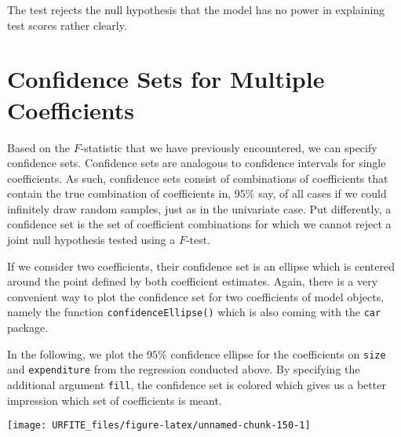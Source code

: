 \documentclass[]{book}
\newenvironment{Shaded}{\begin{snugshade}}{\end{snugshade}}
\newcommand{\KeywordTok}[1]{\textcolor[rgb]{0.13,0.29,0.53}{\textbf{#1}}}
\newcommand{\DataTypeTok}[1]{\textcolor[rgb]{0.13,0.29,0.53}{#1}}
\newcommand{\StringTok}[1]{\textcolor[rgb]{0.31,0.60,0.02}{#1}}
\newcommand{\CommentTok}[1]{\textcolor[rgb]{0.56,0.35,0.01}{\textit{#1}}}
\newcommand{\NormalTok}[1]{#1}
\theoremstyle{definition}
\theoremstyle{definition}
\theoremstyle{definition}
\theoremstyle{remark}
\begin{document}
The test rejects the null hypothesis that the model has no power in
explaining test scores rather clearly.

\section{Confidence Sets for Multiple
Coefficients}\label{confidence-sets-for-multiple-coefficients}

Based on the \(F\)-statistic that we have previously encountered, we can
specify confidence sets. Confidence sets are analogous to confidence
intervals for single coefficients. As such, confidence sets consist of
combinations of coefficients that contain the true combination of
coefficients in, \(95\%\) say, of all cases if we could infinitely draw
random samples, just as in the univariate case. Put differently, a
confidence set is the set of coefficient combinations for which we
cannot reject a joint null hypothesis tested using a \(F\)-test.

If we consider two coefficients, their confidence set is an ellipse
which is centered around the point defined by both coefficient
estimates. Again, there is a very convenient way to plot the confidence
set for two coefficients of model objects, namely the function
\texttt{confidenceEllipse()} which is also coming with the \texttt{car}
package.

In the following, we plot the \(95\%\) confidence ellipse for the
coefficients on \texttt{size} and \texttt{expenditure} from the
regression conducted above. By specifying the additional argument
\texttt{fill}, the confidence set is colored which gives us a better
impression which set of coefficients is meant.

\begin{Shaded}
\end{Shaded}

\begin{center}\texttt{[image: URFITE\_files/figure-latex/unnamed-chunk-150-1]} \end{center}
\end{document}
